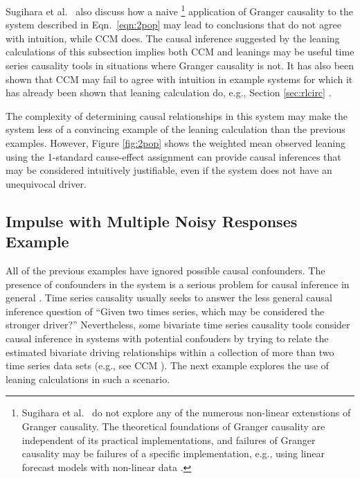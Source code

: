 \documentclass[twocolumn,aps,pre,groupedaddress]{revtex4-1}
\begin{document}
Sugihara et al.\ \cite{Sugihara2012} also discuss how a naive \footnote{Sugihara et al.\ \cite{Sugihara2012} do not explore any of the numerous non-linear extenstions of Granger causality.  The theoretical foundations of Granger causality are independent of its practical implementations, and failures of Granger causality may be failures of a specific implementation, e.g., using linear forecast models with non-linear data \cite{Granger1980}.} application of Granger causality to the system described in Eqn.\ \ref{eqn:2pop} may lead to conclusions that do not agree with intuition, while CCM does.  The causal inference suggested by the leaning calculations of this subsection implies both CCM and leanings may be useful time series causality tools in situations where Granger causality is not.  It has also been shown that CCM may fail to agree with intuition in example systems for which it has already been shown that leaning calculation do, e.g., Section \ref{sec:rlcirc} \cite{Weigel2014}.

The complexity of determining causal relationships in this system may make the system less of a convincing example of the leaning calculation than the previous examples.  However, Figure \ref{fig:2pop} shows the weighted mean observed leaning using the 1-standard cause-effect assignment can provide causal inferences that may be considered intuitively justifiable, even if the system does not have an unequivocal driver. 

\subsection{Impulse with Multiple Noisy Responses Example}

All of the previous examples have ignored possible causal confounders.  The presence of confounders in the system is a serious problem for causal inference in general \cite{Rubin2015,Pearl2000}.  Time series causality usually seeks to answer the less general causal inference question of ``Given two times series, which may be considered the stronger driver?'' Nevertheless, some bivariate time series causality tools consider causal inference in systems with potential confouders by trying to relate the estimated bivariate driving relationships within a collection of more than two time series data sets (e.g., see CCM \cite{Sugihara2012}).  The next example explores the use of leaning calculations in such a scenario.
\end{document}
